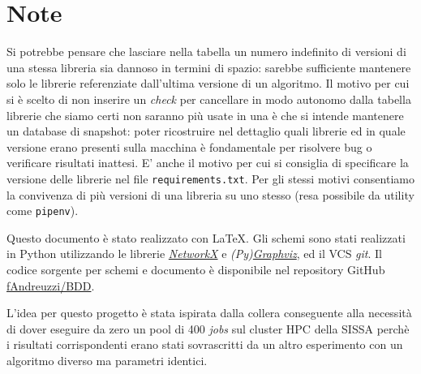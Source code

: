 \documentclass{article}
\begin{document}
\section{Note}
Si potrebbe pensare che lasciare nella tabella  un numero indefinito di versioni di una stessa libreria sia dannoso in termini di spazio: sarebbe sufficiente mantenere solo le librerie referenziate dall'ultima versione di un algoritmo. Il motivo per cui si è scelto di non inserire un \emph{check} per cancellare in modo autonomo dalla tabella librerie che siamo certi non saranno più usate in una  è che si intende mantenere un database di snapshot: poter ricostruire nel dettaglio quali librerie ed in quale versione erano presenti sulla macchina è fondamentale per risolvere bug o verificare risultati inattesi. E' anche il motivo per cui si consiglia di specificare la versione delle librerie nel file \texttt{requirements.txt}. Per gli stessi motivi consentiamo la convivenza di più versioni di una libreria su uno stesso  (resa possibile da utility come \texttt{pipenv}).

Questo documento è stato realizzato con \LaTeX. Gli schemi sono stati realizzati in Python utilizzando le librerie \href{https://networkx.org/documentation/stable/index.html}{\emph{NetworkX}} e \emph{(Py)\href{http://www.graphviz.org/}{Graphviz}}, ed il VCS \emph{git}. Il codice sorgente per schemi e documento è disponibile nel repository GitHub \href{https://github.com/fAndreuzzi/BDD}{fAndreuzzi/BDD}.

L'idea per questo progetto è stata ispirata dalla collera conseguente alla necessità di dover eseguire da zero un pool di 400 \emph{jobs} sul cluster HPC della SISSA perchè i risultati corrispondenti erano stati sovrascritti da un altro esperimento con un algoritmo diverso ma parametri identici.
\end{document}
